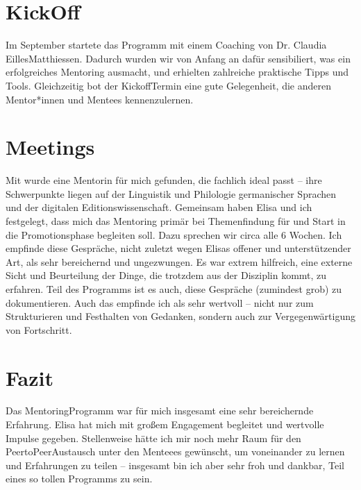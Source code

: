 \documentclass[letterpaper,10pt,english]{jupyterBook}
\begin{document}
\section{Kick\sphinxhyphen{}Off}
\label{\detokenize{mentoring/meine-erfahrungen:kick-off}}
\sphinxAtStartPar
Im September startete das Programm mit einem Coaching von Dr. Claudia Eilles\sphinxhyphen{}Matthiessen. Dadurch wurden wir von Anfang an dafür sensibiliert, was ein erfolgreiches Mentoring ausmacht, und erhielten zahlreiche praktische Tipps und Tools. Gleichzeitig bot der Kick\sphinxhyphen{}off\sphinxhyphen{}Termin eine gute Gelegenheit, die anderen Mentor*innen und Mentees kennenzulernen.


\section{Meetings}
\label{\detokenize{mentoring/meine-erfahrungen:meetings}}
\sphinxAtStartPar
Mit  wurde eine Mentorin für mich gefunden, die fachlich ideal passt – ihre Schwerpunkte liegen auf der Linguistik und Philologie germanischer Sprachen und der digitalen Editionswissenschaft.
Gemeinsam haben Elisa und ich festgelegt, dass mich das Mentoring primär bei Themenfindung für und Start in die Promotionsphase begleiten soll. Dazu sprechen wir circa alle 6 Wochen.
Ich empfinde diese Gespräche, nicht zuletzt wegen Elisas offener und unterstützender Art, als sehr bereichernd und ungezwungen. Es war extrem hilfreich, eine externe Sicht und Beurteilung der Dinge, die trotzdem aus der Disziplin kommt, zu erfahren.
Teil des Programms ist es auch, diese Gespräche (zumindest grob) zu dokumentieren. Auch das empfinde ich als sehr wertvoll – nicht nur zum Strukturieren und Festhalten von Gedanken, sondern auch zur Vergegenwärtigung von Fortschritt.


\section{Fazit}
\label{\detokenize{mentoring/meine-erfahrungen:fazit}}
\sphinxAtStartPar
Das Mentoring\sphinxhyphen{}Programm war für mich insgesamt eine sehr bereichernde Erfahrung. Elisa hat mich mit großem Engagement begleitet und wertvolle Impulse gegeben. Stellenweise hätte ich mir noch mehr Raum für den Peer\sphinxhyphen{}to\sphinxhyphen{}Peer\sphinxhyphen{}Austausch unter den Menteees gewünscht, um voneinander zu lernen und Erfahrungen zu teilen – insgesamt bin ich aber sehr froh und dankbar, Teil eines so tollen Programms zu sein.
\end{document}
